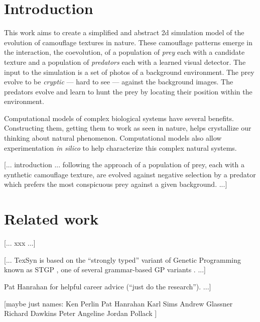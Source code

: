 \documentclass[sigconf]{acmart}
\begin{document}
\maketitle

\section{Introduction}
This work aims to create a simplified and abstract 2d simulation model of the evolution of camouflage textures in nature. These camouflage patterns emerge in the interaction, the coevolution, of a population of \textit{prey} each with a candidate texture and a population of \textit{predators} each with a learned visual detector. The input to the simulation is a set of photos of a background environment. The prey evolve to be \textit{cryptic} — hard to see — against the background images. The predators evolve and learn to hunt the prey by locating their position within the environment.

Computational models of complex biological systems have several benefits. Constructing them, getting them to work as seen in nature, helps crystallize our thinking about natural phenomenon. Computational models also allow experimentation \textit{in silico} to help characterize this complex natural systems.

[... introduction ... following the approach of \citet{Reynolds2011} a population of prey, each with a synthetic camouflage texture, are evolved against negative selection by a predator which prefers the most conspicuous prey against a given background. ...]

\section{Related work}
[... xxx ...]

[... TexSyn is based on the “strongly typed” variant of Genetic Programming known as STGP \cite{montana_strongly_1995}, one of several grammar-based GP variants \cite{Mckay_2010}. ...]

\begin{acks}
[... Many thanks to all who helped me with this work: my supportive family, Andrew Glassner for teaching me everything I know about deep learning, Ken Perlin for, lots but especially [An Image Synthesizer?] Pat Hanrahan for helpful career advice (“just do the research”). ...]

[maybe just names: 
Ken Perlin
Pat Hanrahan
Karl Sims
Andrew Glassner
Richard Dawkins
Peter Angeline 
Jordan Pollack
]
\end{acks}
\end{document}
